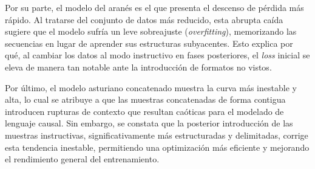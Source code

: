 Por su parte, el modelo del aranés es el que presenta el descenso de pérdida más rápido. Al tratarse del conjunto de datos más reducido, esta abrupta caída sugiere que el modelo sufría un leve sobreajuste (\textit{overfitting}), memorizando las secuencias en lugar de aprender sus estructuras subyacentes. Esto explica por qué, al cambiar los datos al modo instructivo en fases posteriores, el \textit{loss} inicial se eleva de manera tan notable ante la introducción de formatos no vistos.

Por último, el modelo asturiano concatenado muestra la curva más inestable y alta, lo cual se atribuye a que las muestras concatenadas de forma contigua introducen rupturas de contexto que resultan caóticas para el modelado de lenguaje causal. Sin embargo, se constata que la posterior introducción de las muestras instructivas, significativamente más estructuradas y delimitadas, corrige esta tendencia inestable, permitiendo una optimización más eficiente y mejorando el rendimiento general del entrenamiento.